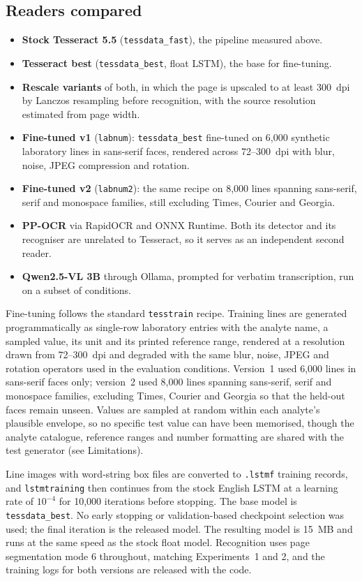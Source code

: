\documentclass[11pt]{article}
\begin{document}
\subsection{Readers compared}

\begin{itemize}
\item \textbf{Stock Tesseract 5.5} (\texttt{tessdata\_fast}), the pipeline measured above.
\item \textbf{Tesseract best} (\texttt{tessdata\_best}, float LSTM), the base for fine-tuning.
\item \textbf{Rescale variants} of both, in which the page is upscaled to at least 300~dpi by
Lanczos resampling before recognition, with the source resolution estimated from page width.
\item \textbf{Fine-tuned v1} (\texttt{labnum}): \texttt{tessdata\_best} fine-tuned on 6{,}000
synthetic laboratory lines in sans-serif faces, rendered across 72--300~dpi with blur, noise,
JPEG compression and rotation.
\item \textbf{Fine-tuned v2} (\texttt{labnum2}): the same recipe on 8{,}000 lines spanning
sans-serif, serif and monospace families, still excluding Times, Courier and Georgia.
\item \textbf{PP-OCR} via RapidOCR and ONNX Runtime. Both its detector and its
recogniser are unrelated to Tesseract, so it serves as an independent second reader.
\item \textbf{Qwen2.5-VL 3B} through Ollama, prompted for verbatim transcription, run on a
subset of conditions.
\end{itemize}

Fine-tuning follows the standard \texttt{tesstrain} recipe. Training lines are generated
programmatically as single-row laboratory entries with the analyte name, a sampled value, its
unit and its printed reference range, rendered at a resolution drawn from 72--300~dpi and
degraded with the same blur, noise, JPEG and rotation operators used in the evaluation
conditions. Version~1 used 6{,}000 lines in sans-serif faces only; version~2 used 8{,}000 lines
spanning sans-serif, serif and monospace families, excluding Times, Courier and Georgia so that
the held-out faces remain unseen. Values are sampled at random within each analyte's plausible
envelope, so no specific test value can have been memorised, though the analyte catalogue,
reference ranges and number formatting are shared with the test generator (see Limitations).

Line images with word-string box files are converted to \texttt{.lstmf} training records, and
\texttt{lstmtraining} then continues from the stock English LSTM at a learning rate of
$10^{-4}$ for 10{,}000 iterations before stopping. The base model is \texttt{tessdata\_best}. No early
stopping or validation-based checkpoint selection was used; the final iteration is the released
model. The resulting model is 15~MB and runs at the same speed as the stock float model.
Recognition uses page segmentation mode 6 throughout, matching Experiments~1 and 2, and the
training logs for both versions are released with the code.
\end{document}
